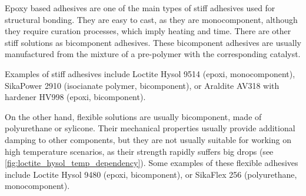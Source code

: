 \documentclass[
documentsize = a4, %
font = cmr, %
typesize = 11, %
printmode = true,
onehalfspacing = true,
language = en, %
titlepage = udciccp, %
degree = pt, %
dedication = true,
acknowledgements = true,
abstract-en = true,
abstract-es = false,
abstract-ga = false,
epigraphs = true,
toc = true,
lof = true,
lot = true,
frontmatterintoc = false,
notation = false,
minimal = false,
]{UDCthesis}
\begin{document}
Epoxy based adhesives are one of the main types of stiff adhesives used for structural bonding. They are easy to cast, as they are monocomponent, although they require curation processes, which imply heating and time. There are other stiff solutions as bicomponent adhesives. These bicomponent adhesives are usually manufactured from the mixture of a pre-polymer with the corresponding catalyst.

Examples of stiff adhesives include Loctite Hysol 9514 \citep{manufCatalog} (epoxi, monocomponent), SikaPower 2910 (isocianate polymer, bicomponent), or Araldite AV318 with hardener HV998 (epoxi, bicomponent).

On the other hand, flexible solutions are usually bicomponent, made of polyurethane or sylicone. Their mechanical properties usually provide additional damping to other components, but they are not usually suitable for working on high temperature scenarios, as their strength rapidly suffers big drops (see \cref{fig:loctite_hysol_temp_dependency}). Some examples of these flexible adhesives include Loctite Hysol 9480 (epoxi, bicomponent), or SikaFlex 256 (polyurethane, monocomponent).
\end{document}
